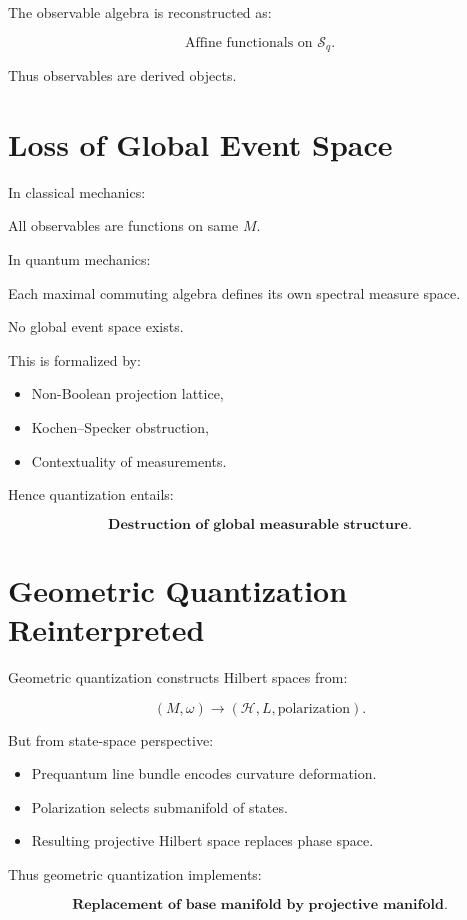 \documentclass[11pt]{book}
\begin{document}
The observable algebra is reconstructed as:

\[
\text{Affine functionals on } \mathcal{S}_q.
\]

Thus observables are derived objects.

\section{Loss of Global Event Space}

In classical mechanics:

All observables are functions on same $M$.

In quantum mechanics:

Each maximal commuting algebra defines its own spectral measure space.

No global event space exists.

This is formalized by:

\begin{itemize}
\item Non-Boolean projection lattice,
\item Kochen--Specker obstruction,
\item Contextuality of measurements.
\end{itemize}

Hence quantization entails:

\[
\textbf{Destruction of global measurable structure}.
\]

\section{Geometric Quantization Reinterpreted}

Geometric quantization constructs Hilbert spaces from:

\[
(M,\omega)
\to
(\mathcal{H}, L, \text{polarization}).
\]

But from state-space perspective:

\begin{itemize}
\item Prequantum line bundle encodes curvature deformation.
\item Polarization selects submanifold of states.
\item Resulting projective Hilbert space replaces phase space.
\end{itemize}

Thus geometric quantization implements:

\[
\textbf{Replacement of base manifold by projective manifold}.
\]
\end{document}
